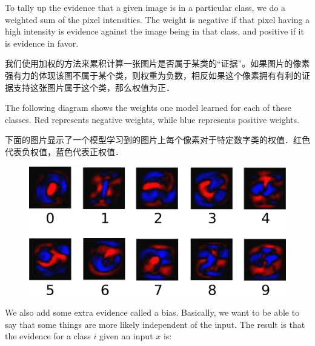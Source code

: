 To tally up the evidence that a given image is in a particular class, we do a weighted sum of the pixel intensities. The weight is negative if that pixel having a high intensity is evidence against the image being in that class, and positive if it is evidence in favor.

我们使用加权的方法来累积计算一张图片是否属于某类的“证据”。如果图片的像素强有力的体现该图不属于某个类，则权重为负数，相反如果这个像素拥有有利的证据支持这张图片属于这个类，那么权值为正．

The following diagram shows the weights one model learned for each of these classes. Red represents negative weights, while blue represents positive weights.

下面的图片显示了一个模型学习到的图片上每个像素对于特定数字类的权值．红色代表负权值，蓝色代表正权值．

\begin{figure}[htbp]
\centering
\includegraphics[width=.65\textwidth]{../SOURCE/images/softmax-weights.png}
\caption{}
\end{figure}

We also add some extra evidence called a bias. Basically, we want to be able to say that some things are more likely independent of the input. The result is that the evidence for a class $i$ given an input $x$ is:

